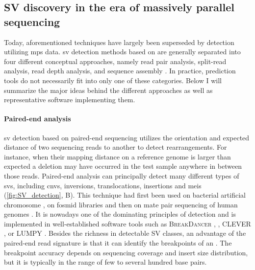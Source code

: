 \subsection{SV discovery in the era of massively parallel sequencing}
\label{sec:sv_detection_ngs}

Today, aforementioned techniques have largely been superseded by \sv detection
utilizing \acl{mps} data.
\Ac{sv} detection methods based on \mps are generally
separated into four different conceptual approaches, namely read pair analysis,
split-read analysis, read depth analysis, and sequence assembly \citep{Alkan2011}. In practice,
\sv prediction tools do not necessarily fit into only one of these categories.
Below I will summarize the major ideas behind the different approaches as well
as representative software implementing them.

\paragraph{Paired-end analysis}
\Ac{sv} detection based on paired-end sequencing utilizes the orientation and
expected distance of two sequencing reads to another to detect rearrangements.
For instance, when their mapping distance on a reference genome is larger than
expected a deletion may have occurred in the test sample anywhere in between
those reads. Paired-end analysis can principally detect many different types of
\acp{sv}, including \acp{cnv}, inversions, translocations, insertions and
\acp{mei} (\cref{fig:SV_detection}, B). This technique had first been used on
bacterial artificial chromosome
\citep{Volik2003}, on fosmid libraries \citep{Tuzun2005} and then on mate pair
sequencing of human genomes \citep{Korbel2007}. It is nowadays one of the
dominating principles of \sv detection and is implemented in well-established
software tools such as \textsc{BreakDancer} \citep{Chen2009}, \delly,
\textsc{CLEVER} \citep{Marschall2012}, or \textsc{LUMPY} \citep{Layer2014}.
Besides the richness in detectable SV classes, an advantage of the paired-end
read signature is that it can identify the breakpoints of an \sv. The breakpoint
accuracy depends on sequencing coverage and insert size distribution, but
it is typically in the range of few to several hundred base pairs.

